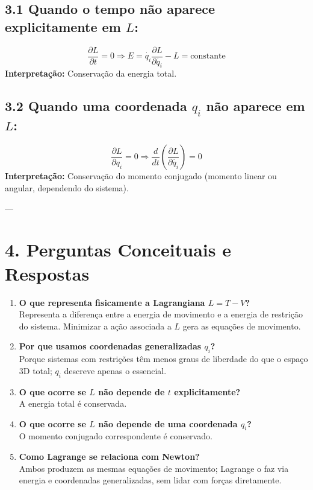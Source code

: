 \documentclass[a4paper,12pt]{article}
\begin{document}
\subsection*{3.1 Quando o tempo não aparece explicitamente em $L$:}
\[
\frac{\partial L}{\partial t} = 0 \Rightarrow E = \dot{q_i}\frac{\partial L}{\partial \dot{q_i}} - L = \text{constante}
\]
\textbf{Interpretação:} Conservação da energia total.

\subsection*{3.2 Quando uma coordenada $q_i$ não aparece em $L$:}
\[
\frac{\partial L}{\partial q_i} = 0 \Rightarrow \frac{d}{dt}\left( \frac{\partial L}{\partial \dot{q_i}} \right) = 0
\]
\textbf{Interpretação:} Conservação do momento conjugado (momento linear ou angular, dependendo do sistema).

---

\section*{4. Perguntas Conceituais e Respostas}

\begin{enumerate}
    \item \textbf{O que representa fisicamente a Lagrangiana $L = T - V$?}\\
    Representa a diferença entre a energia de movimento e a energia de restrição do sistema. Minimizar a ação associada a $L$ gera as equações de movimento.

    \item \textbf{Por que usamos coordenadas generalizadas $q_i$?}\\
    Porque sistemas com restrições têm menos graus de liberdade do que o espaço 3D total; $q_i$ descreve apenas o essencial.

    \item \textbf{O que ocorre se $L$ não depende de $t$ explicitamente?}\\
    A energia total é conservada.

    \item \textbf{O que ocorre se $L$ não depende de uma coordenada $q_i$?}\\
    O momento conjugado correspondente é conservado.

    \item \textbf{Como Lagrange se relaciona com Newton?}\\
    Ambos produzem as mesmas equações de movimento; Lagrange o faz via energia e coordenadas generalizadas, sem lidar com forças diretamente.
\end{enumerate}
\end{document}
